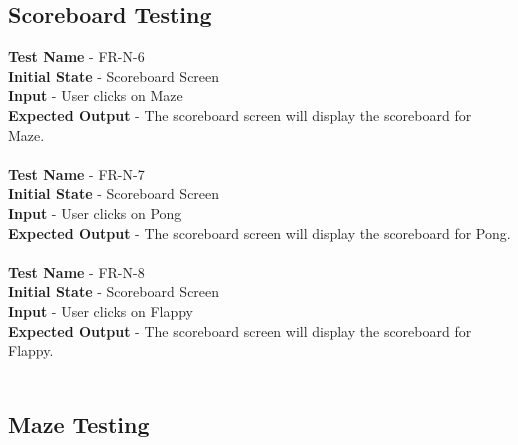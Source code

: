 \documentclass[12pt, titlepage]{article}
\begin{document}
\subsection{Scoreboard Testing}

\textbf{Test Name} - FR-N-6\\
\textbf{Initial State} - Scoreboard Screen\\
\textbf{Input} - User clicks on Maze\\
\textbf{Expected Output} - The scoreboard screen will display the scoreboard for Maze.\\ \\
\textbf{Test Name} - FR-N-7\\
\textbf{Initial State} - Scoreboard Screen\\
\textbf{Input} - User clicks on Pong\\
\textbf{Expected Output} - The scoreboard screen will display the scoreboard for Pong.\\ \\
\textbf{Test Name} - FR-N-8\\
\textbf{Initial State} - Scoreboard Screen\\
\textbf{Input} - User clicks on Flappy\\
\textbf{Expected Output} - The scoreboard screen will display the scoreboard for Flappy.\\ \\

\subsection{Maze Testing}
\end{document}
